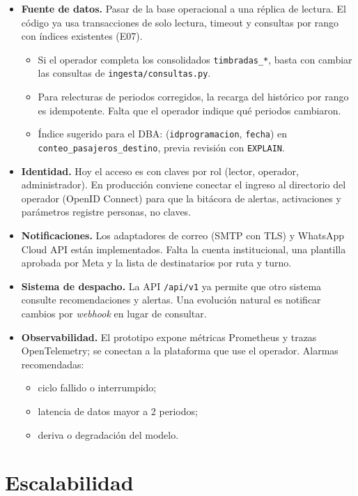 \documentclass[11pt,a4paper]{article}
\newcommand{\cod}[1]{\texttt{\small #1}}
\begin{document}
\begin{itemize}
  \setlength{\itemsep}{0.15em}
  \item \textbf{Fuente de datos.} Pasar de la base operacional a una réplica de lectura. El código ya usa transacciones de solo lectura, timeout y consultas por rango con índices existentes (E07).
    \begin{itemize}
      \item Si el operador completa los consolidados \cod{timbradas\_*}, basta con cambiar las consultas de \cod{ingesta/consultas.py}.
      \item Para relecturas de periodos corregidos, la recarga del histórico por rango es idempotente. Falta que el operador indique qué periodos cambiaron.
      \item Índice sugerido para el DBA: (\cod{idprogramacion}, \cod{fecha}) en \cod{conteo\_pasajeros\_destino}, previa revisión con \cod{EXPLAIN}.
    \end{itemize}
  \item \textbf{Identidad.} Hoy el acceso es con claves por rol (lector, operador, administrador). En producción conviene conectar el ingreso al directorio del operador (OpenID Connect) para que la bitácora de alertas, activaciones y parámetros registre personas, no claves.
  \item \textbf{Notificaciones.} Los adaptadores de correo (SMTP con TLS) y WhatsApp Cloud API están implementados. Falta la cuenta institucional, una plantilla aprobada por Meta y la lista de destinatarios por ruta y turno.
  \item \textbf{Sistema de despacho.} La API \cod{/api/v1} ya permite que otro sistema consulte recomendaciones y alertas. Una evolución natural es notificar cambios por \emph{webhook} en lugar de consultar.
  \item \textbf{Observabilidad.} El prototipo expone métricas Prometheus y trazas OpenTelemetry; se conectan a la plataforma que use el operador. Alarmas recomendadas:
    \begin{itemize}
      \item ciclo fallido o interrumpido;
      \item latencia de datos mayor a 2 periodos;
      \item deriva o degradación del modelo.
    \end{itemize}
\end{itemize}

\section{Escalabilidad}
\end{document}
